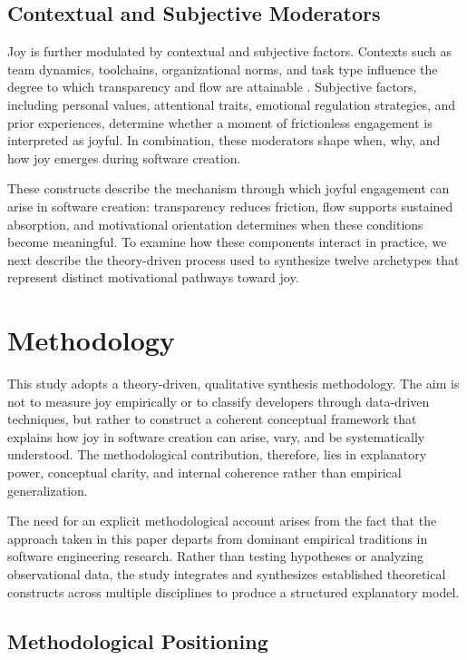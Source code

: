 \documentclass[12pt]{elsarticle}
\begin{document}
\subsection{Contextual and Subjective Moderators}
Joy is further modulated by contextual and subjective factors. Contexts
such as team dynamics, toolchains, organizational norms, and task type
influence the degree to which transparency and flow are attainable
\cite{csikszentmihalyi1990flow}. Subjective factors, including personal values, attentional
traits, emotional regulation strategies, and prior experiences, determine
whether a moment of frictionless engagement is interpreted as joyful. In
combination, these moderators shape when, why, and how joy emerges during
software creation.

\smallskip
These constructs describe the mechanism through which joyful 
engagement can arise in software creation: transparency reduces friction, flow 
supports sustained absorption, and motivational orientation determines when 
these conditions become meaningful. To examine how these components interact in 
practice, we next describe the theory-driven process used to synthesize twelve 
archetypes that represent distinct motivational pathways toward joy.

\section{Methodology}\label{sec:methodology}

This study adopts a theory-driven, qualitative synthesis methodology. The aim is not to measure joy empirically or to classify developers through data-driven techniques, but rather to construct a coherent conceptual framework that explains how joy in software creation can arise, vary, and be systematically understood. The methodological contribution, therefore, lies in explanatory power, conceptual clarity, and internal coherence rather than empirical generalization.

The need for an explicit methodological account arises from the fact that the approach taken in this paper departs from dominant empirical traditions in software engineering research. Rather than testing hypotheses or analyzing observational data, the study integrates and synthesizes established theoretical constructs across multiple disciplines to produce a structured explanatory model.

\subsection{Methodological Positioning}
\end{document}
